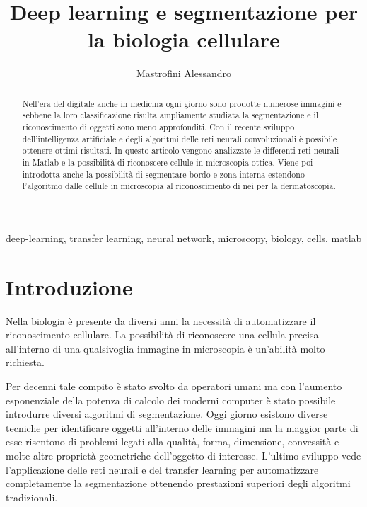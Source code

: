 \documentclass{ieeeojies}
\begin{document}
\title{Deep learning e segmentazione per la biologia cellulare}
\author{{Mastrofini Alessandro}}
\address[1]{alessandro.mastrofini@alumni.uniroma2.eu}

\begin{abstract}
Nell’era del digitale anche in medicina ogni giorno sono prodotte numerose immagini e sebbene la loro classificazione risulta ampliamente studiata la segmentazione e il riconoscimento di oggetti sono meno approfonditi. Con il recente sviluppo dell’intelligenza artificiale e degli algoritmi delle reti neurali convoluzionali è possibile ottenere ottimi risultati. In questo articolo vengono analizzate le differenti reti neurali in Matlab e la possibilità di riconoscere cellule in microscopia ottica. Viene poi introdotta anche la possibilità di segmentare bordo e zona interna estendono l’algoritmo dalle cellule in microscopia al riconoscimento di nei per la dermatoscopia.
\end{abstract}

\begin{keywords}
deep-learning, transfer learning, neural network, microscopy, biology, cells, matlab
\end{keywords}

\titlepgskip=-15pt

\maketitle

\section*{Introduzione}
\label{sec:introduction}
Nella biologia è presente da diversi anni la necessità di automatizzare il riconoscimento cellulare. La possibilità di riconoscere una cellula precisa all’interno di una qualsivoglia immagine in microscopia è un’abilità molto richiesta.

 Per decenni tale compito è stato svolto da operatori umani ma con l’aumento esponenziale della potenza di calcolo dei moderni computer è stato possibile introdurre diversi algoritmi di segmentazione. Oggi giorno esistono diverse tecniche per identificare oggetti all’interno delle immagini ma la maggior parte di esse risentono di problemi legati alla qualità, forma, dimensione, convessità e molte altre proprietà geometriche dell’oggetto di interesse. L’ultimo sviluppo vede l’applicazione delle reti neurali e del transfer learning per automatizzare completamente la segmentazione ottenendo prestazioni superiori degli algoritmi tradizionali.
\end{document}
